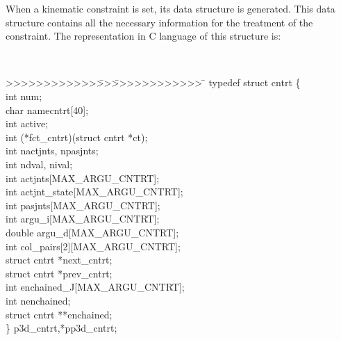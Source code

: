 When a kinematic constraint is set, its data structure is
generated. This data structure contains all the necessary information
for the treatment of the constraint. The representation in C language
of this structure is:
{\tt
\begin{tabbing}
>>>>>>>>>>>>\=>>\=>>>>>>>>>>>> \= \kill
\>typedef struct cntrt \{ \\ 
\>\>  int       \> num;\\
\>\>  char      \> namecntrt[40];\\
\>\>  int       \> active;\\
\>\>  int       \> (*fct\_cntrt)(struct cntrt *ct);\\
\>\>  int       \> nactjnts, npasjnts;\\
\>\>  int       \> ndval, nival;\\
\>\>  int       \> actjnts[MAX\_ARGU\_CNTRT];\\
\>\>  int       \> actjnt\_state[MAX\_ARGU\_CNTRT];\\
\>\>  int       \> pasjnts[MAX\_ARGU\_CNTRT];\\
\>\>  int       \> argu\_i[MAX\_ARGU\_CNTRT];\\
\>\>  double    \> argu\_d[MAX\_ARGU\_CNTRT];\\
\>\>  int       \> col\_pairs[2][MAX\_ARGU\_CNTRT];\\
\>\>  struct cntrt \> *next\_cntrt;\\
\>\>  struct cntrt \> *prev\_cntrt;\\
\>\>  int       \> enchained\_J[MAX\_ARGU\_CNTRT];\\
\>\>  int       \> nenchained;\\
\>\>  struct cntrt \> **enchained;\\
\>\} p3d\_cntrt,*pp3d\_cntrt; \\
\end{tabbing}
}

